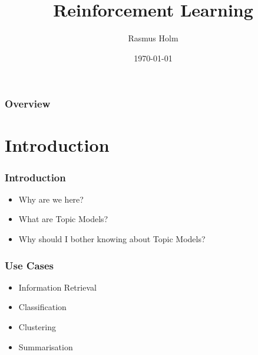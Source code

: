 \documentclass{beamer}
\title[Reinforcement Learning]{Reinforcement Learning}
\author[Rasmus Holm]{Rasmus Holm}
\institute[LiU]{
Linköping University \\
}
\date{\today}
\begin{document}

    \begin{frame}
        \titlepage
    \end{frame}

    \begin{frame}
        \frametitle{Overview}
        \tableofcontents
    \end{frame}


    \section{Introduction}

    \begin{frame}
        \frametitle{Introduction}
        \begin{itemize}
            \item Why are we here?
            \item What are Topic Models?
            \item Why should I bother knowing about Topic Models?
        \end{itemize}
    \end{frame}

    \begin{frame}
        \frametitle{Use Cases}
        \begin{itemize}
            \item Information Retrieval
            \item Classification
            \item Clustering
            \item Summarisation
        \end{itemize}
    \end{frame}
\end{document}
